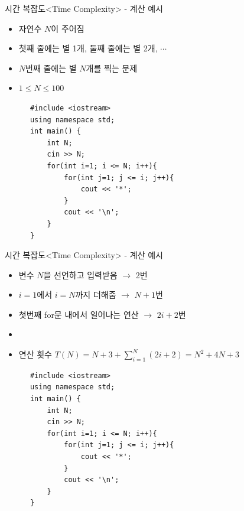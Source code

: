 \begin{frame}[fragile]{시간 복잡도}{<Time Complexity> - 계산 예시}
  \begin{center}
  \end{center}
  \vspace{2mm}
  \begin{twocol}
    \begin{itemize}
      \item 자연수 $N$이 주어짐
      \item 첫째 줄에는 별 1개, 둘째 줄에는 별 2개, $\cdots$
      \item $N$번째 줄에는 별 $N$개를 찍는 문제
    \end{itemize}
    \vspace{3mm}
    \begin{itemize}
      \item $1 \le N \le 100$
    \end{itemize}
  \colsplit
    \begin{verbatim}
      #include <iostream>
      using namespace std;
      int main() {
          int N;
          cin >> N;
          for(int i=1; i <= N; i++){
              for(int j=1; j <= i; j++){
                  cout << '*';
              }
              cout << '\n';
          }
      }
    \end{verbatim}
  \end{twocol}
\end{frame}

\begin{frame}[fragile]{시간 복잡도}{<Time Complexity> - 계산 예시}
  \begin{center}
  \end{center}
  \vspace{2mm}
  \begin{twocol}
    \begin{itemize}
      \item 변수 $N$을 선언하고 입력받음 $\to$ 2번
      \item $i=1$에서 $i=N$까지 더해줌 $\to$ $N+1$번
      \item 첫번째 for문 내에서 일어나는 연산 $\to$ $2i+2$번
      \item[] \vspace{1mm}
      \item 연산 횟수
        $T(N) = N + 3 + \sum\limits_{i=1}^{N}(2i+2) = N^2 + 4N + 3$
    \end{itemize}
  \colsplit
    \begin{verbatim}
      #include <iostream>
      using namespace std;
      int main() {
          int N;
          cin >> N;
          for(int i=1; i <= N; i++){
              for(int j=1; j <= i; j++){
                  cout << '*';
              }
              cout << '\n';
          }
      }
    \end{verbatim}
  \end{twocol}
\end{frame}

